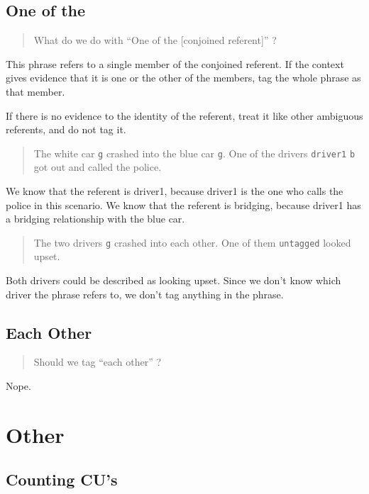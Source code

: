 \documentclass[
]{book}
\begin{document}
\hypertarget{one-of-the}{%
\subsection{One of the}\label{one-of-the}}

\begin{quote}
What do we do with ``One of the {[}conjoined referent{]}'' ?
\end{quote}

This phrase refers to a single member of the conjoined referent.
If the context gives evidence that it is one or the other of the members, tag the whole phrase as that member.

If there is no evidence to the identity of the referent, treat it like other ambiguous referents, and do not tag it.

\begin{quote}
The white car \texttt{g} crashed into the blue car \texttt{g}.
One of the drivers \texttt{driver1} \texttt{b} got out and called the police.
\end{quote}

We know that the referent is driver1, because driver1 is the one who calls the police in this scenario.
We know that the referent is bridging, because driver1 has a bridging relationship with the blue car.

\begin{quote}
The two drivers \texttt{g} crashed into each other.
One of them \texttt{untagged} looked upset.
\end{quote}

Both drivers could be described as looking upset.
Since we don't know which driver the phrase refers to, we don't tag anything in the phrase.

\hypertarget{each-other}{%
\subsection{Each Other}\label{each-other}}

\begin{quote}
Should we tag ``each other'' ?
\end{quote}

Nope.

\hypertarget{other}{%
\section{Other}\label{other}}

\hypertarget{counting-cus}{%
\subsection{Counting CU's}\label{counting-cus}}
\end{document}
